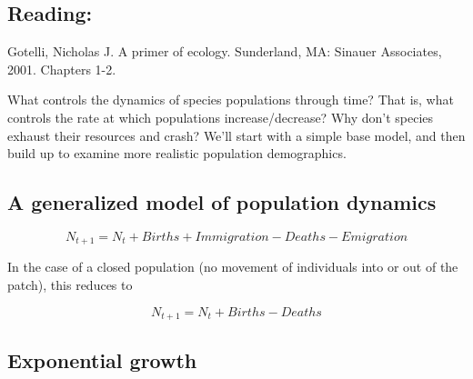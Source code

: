 \documentclass[12pt]{article}
\begin{document}
\subsection*{Reading:}

Gotelli, Nicholas J. A primer of ecology. Sunderland, MA: Sinauer Associates, 2001. Chapters 1-2.















\begin{center}
\noindent\hrulefill 
\end{center}



\clearpage

What controls the dynamics of species populations through time? That is, what controls the rate at which populations increase/decrease? Why don't species exhaust their resources and crash? We'll start with a simple base model, and then build up to examine more realistic population demographics. 







\subsection*{A generalized model of population dynamics}

\begin{equation}
N_{t+1} = N_{t} + Births + Immigration - Deaths - Emigration 
\end{equation}

In the case of a closed population (no movement of individuals into or out of the patch), this reduces to 


\begin{equation}
N_{t+1} = N_{t} + Births - Deaths
\end{equation}







\bigskip







\subsection*{Exponential growth}
\end{document}
